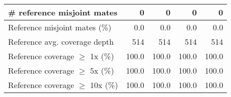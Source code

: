 \documentclass[12pt,a4paper]{article}
\begin{document}
\begin{table}[ht]
\begin{center}
\begin{tabular}{|l*{4}{|r}|}
\# reference misjoint mates & 0 & 0 & 0 & 0 \\ \hline
Reference misjoint mates (\%) & 0.0 & 0.0 & 0.0 & 0.0 \\ \hline
Reference avg. coverage depth & 514 & 514 & 514 & 514 \\ \hline
Reference coverage $\geq$ 1x (\%) & 100.0 & 100.0 & 100.0 & 100.0 \\ \hline
Reference coverage $\geq$ 5x (\%) & 100.0 & 100.0 & 100.0 & 100.0 \\ \hline
Reference coverage $\geq$ 10x (\%) & 100.0 & 100.0 & 100.0 & 100.0 \\ \hline
\end{tabular}
\end{center}
\end{table}
\end{document}
